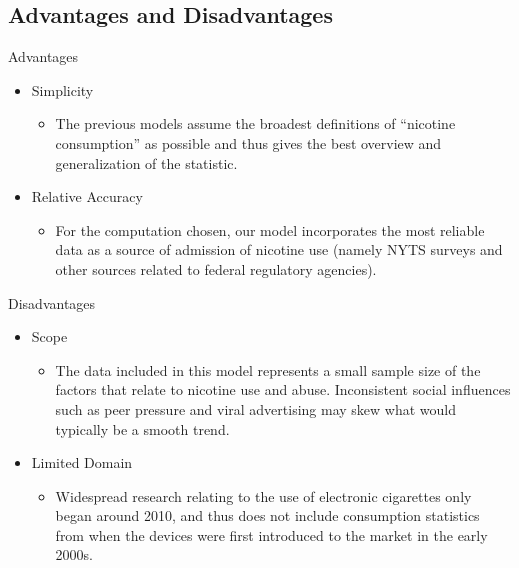 \subsection{Advantages and Disadvantages}

Advantages
\begin{itemize}
    \item Simplicity
    \begin{itemize}
        \item The previous models assume the broadest definitions of “nicotine consumption” as possible and thus gives the best overview and generalization of the statistic.
    \end{itemize}
    \item Relative Accuracy
    \begin{itemize}
        \item For the computation chosen, our model incorporates the most reliable data as a source of admission of nicotine use (namely NYTS surveys and other sources related to federal regulatory agencies).
    \end{itemize}
\end{itemize}

Disadvantages
\begin{itemize}
    \item Scope
    \begin{itemize}
        \item The data included in this model represents a small sample size of the factors that relate to nicotine use and abuse. Inconsistent social influences such as peer pressure and viral advertising may skew what would typically be a smooth trend.
    \end{itemize}
    \item Limited Domain
    \begin{itemize}
        \item Widespread research relating to the use of electronic cigarettes only began around 2010, and thus does not include consumption statistics from when the devices were first introduced to the market in the early 2000s.
    \end{itemize}
\end{itemize}

